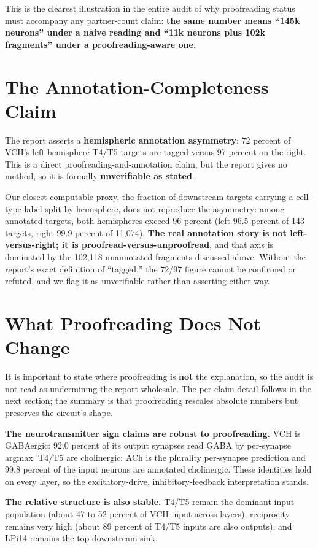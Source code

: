 \documentclass[11pt]{article}
\newcommand{\key}[1]{\textbf{#1}}
\begin{document}
This is the clearest illustration in the entire audit of why proofreading status must
accompany any partner-count claim: \key{the same number means ``145k neurons'' under a
naive reading and ``11k neurons plus 102k fragments'' under a proofreading-aware one.}

\section{The Annotation-Completeness Claim}

The report asserts a \key{hemispheric annotation asymmetry}: 72 percent of VCH's
left-hemisphere T4/T5 targets are tagged versus 97 percent on the right. This is a direct
proofreading-and-annotation claim, but the report gives no method, so it is formally
\key{unverifiable as stated}.

Our closest computable proxy, the fraction of downstream targets carrying a cell-type
label split by hemisphere, does not reproduce the asymmetry: among annotated targets,
both hemispheres exceed 96 percent (left 96.5 percent of 143 targets, right 99.9 percent
of 11{,}074). \key{The real annotation story is not left-versus-right; it is
proofread-versus-unproofread}, and that axis is dominated by the 102{,}118 unannotated
fragments discussed above. Without the report's exact definition of ``tagged,'' the
72/97 figure cannot be confirmed or refuted, and we flag it as unverifiable rather than
asserting either way.

\section{What Proofreading Does Not Change}

It is important to state where proofreading is \key{not} the explanation, so the audit is
not read as undermining the report wholesale. The per-claim detail follows in the next
section; the summary is that proofreading rescales absolute numbers but preserves the
circuit's shape.

\key{The neurotransmitter sign claims are robust to proofreading.} VCH is GABAergic: 92.0
percent of its output synapses read GABA by per-synapse argmax. T4/T5 are cholinergic:
ACh is the plurality per-synapse prediction and 99.8 percent of the input neurons are
annotated cholinergic. These identities hold on every layer, so the excitatory-drive,
inhibitory-feedback interpretation stands.

\key{The relative structure is also stable.} T4/T5 remain the dominant input population
(about 47 to 52 percent of VCH input across layers), reciprocity remains very high (about
89 percent of T4/T5 inputs are also outputs), and LPi14 remains the top downstream sink.
\end{document}
